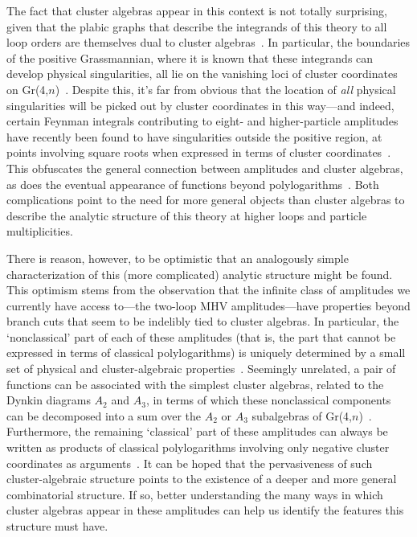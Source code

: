 \documentclass[11pt]{article}
\begin{document}
The fact that cluster algebras appear in this context is not totally surprising, given that the plabic graphs that describe the integrands of this theory to all loop orders are themselves dual to cluster algebras~\cite{ArkaniHamed:2012nw}. In particular, the boundaries of the positive Grassmannian, where it is known that these integrands can develop physical singularities, all lie on the vanishing loci of cluster coordinates on Gr(4,$n$)~\cite{ArkaniHamed:2012nw}. Despite this, it's far from obvious that the location of \emph{all} physical singularities will be picked out by cluster coordinates in this way---and indeed, certain Feynman integrals contributing to eight- and higher-particle amplitudes have recently been found to have singularities outside the positive region, at points involving square roots when expressed in terms of cluster coordinates~\cite{Prlina:2017azl,Bourjaily:2018aeq,Henn:2018cdp}. This obfuscates the general connection between amplitudes and cluster algebras, as does the eventual appearance of functions beyond polylogarithms~\cite{many_citations_to_add,Bourjaily:2017bsb,Bourjaily:2018ycu}. Both complications point to the need for more general objects than cluster algebras to describe the analytic structure of this theory at higher loops and particle multiplicities.

There is reason, however, to be optimistic that an analogously simple characterization of this (more complicated) analytic structure might be found. This optimism stems from the observation that the infinite class of amplitudes we currently have access to---the two-loop MHV amplitudes---have properties beyond branch cuts that seem to be indelibly tied to cluster algebras. In particular, the `nonclassical' part of each of these amplitudes (that is, the part that cannot be expressed in terms of classical polylogarithms) is uniquely determined by a small set of physical and cluster-algebraic properties~\cite{Golden:2014pua}.  Seemingly unrelated, a pair of functions can be associated with the simplest cluster algebras, related to the Dynkin diagrams $A_2$ and $A_3$, in terms of which these nonclassical components can be decomposed into a sum over the $A_2$ or $A_3$ subalgebras of Gr(4,$n$)~\cite{Golden:2014xqa}. Furthermore, the remaining `classical' part of these amplitudes can always be written as products of classical polylogarithms involving only negative cluster coordinates as arguments~\cite{Golden:2014xqf}. It can be hoped that the pervasiveness of such cluster-algebraic structure points to the existence of a deeper and more general combinatorial structure. If so, better understanding the many ways in which cluster algebras appear in these amplitudes can help us identify the features this structure must have.
\end{document}
